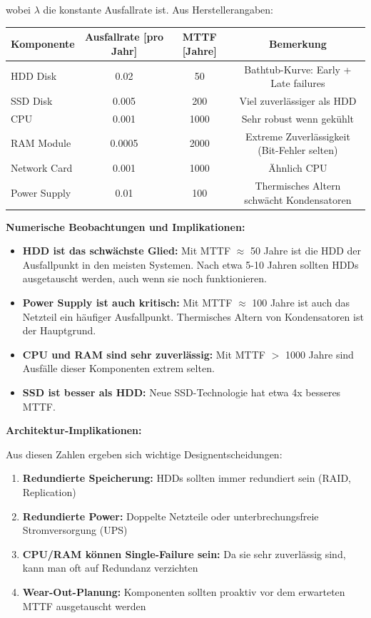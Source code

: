\documentclass[a4paper,11pt]{article}
\theoremstyle{definition}
\begin{document}
wobei $\lambda$ die konstante Ausfallrate ist. Aus Herstellerangaben:

\begin{table}[H]
    \centering
    \begin{tabular}{|l|cc|c|}
        \hline
        Komponente & Ausfallrate [pro Jahr] & MTTF [Jahre] & Bemerkung \\
        \hline
        HDD Disk & 0.02 & 50 & Bathtub-Kurve: Early + Late failures \\
        SSD Disk & 0.005 & 200 & Viel zuverlässiger als HDD \\
        CPU & 0.001 & 1000 & Sehr robust wenn gekühlt \\
        RAM Module & 0.0005 & 2000 & Extreme Zuverlässigkeit (Bit-Fehler selten) \\
        Network Card & 0.001 & 1000 & Ähnlich CPU \\
        Power Supply & 0.01 & 100 & Thermisches Altern schwächt Kondensatoren \\
        \hline
    \end{tabular}
\end{table}

\textbf{Numerische Beobachtungen und Implikationen:}

\begin{itemize}
    \item \textbf{HDD ist das schwächste Glied:} Mit MTTF $\approx$ 50 Jahre ist die HDD 
          der Ausfallpunkt in den meisten Systemen. Nach etwa 5-10 Jahren sollten HDDs 
          ausgetauscht werden, auch wenn sie noch funktionieren.
    
    \item \textbf{Power Supply ist auch kritisch:} Mit MTTF $\approx$ 100 Jahre ist 
          auch das Netzteil ein häufiger Ausfallpunkt. Thermisches Altern von Kondensatoren 
          ist der Hauptgrund.
    
    \item \textbf{CPU und RAM sind sehr zuverlässig:} Mit MTTF $>$ 1000 Jahre sind 
          Ausfälle dieser Komponenten extrem selten.
    
    \item \textbf{SSD ist besser als HDD:} Neue SSD-Technologie hat etwa 4x besseres MTTF.
\end{itemize}

\textbf{Architektur-Implikationen:}

Aus diesen Zahlen ergeben sich wichtige Designentscheidungen:
\begin{enumerate}
    \item \textbf{Redundierte Speicherung:} HDDs sollten immer redundiert sein (RAID, Replication)
    \item \textbf{Redundierte Power:} Doppelte Netzteile oder unterbrechungsfreie Stromversorgung (UPS)
    \item \textbf{CPU/RAM können Single-Failure sein:} Da sie sehr zuverlässig sind, kann man 
          oft auf Redundanz verzichten
    \item \textbf{Wear-Out-Planung:} Komponenten sollten proaktiv vor dem erwarteten MTTF 
          ausgetauscht werden
\end{enumerate}
\end{document}
